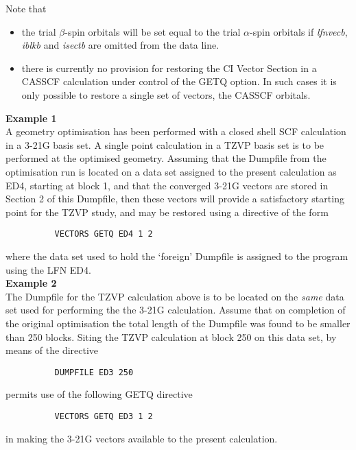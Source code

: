 \documentclass[11pt,fleqn]{article}
\begin{document}
\begin{enumerate}
 Note that
\begin{itemize}
\item  the trial $\beta$-spin orbitals will be set equal to the
trial $\alpha$-spin orbitals if {\em lfnvecb}, {\em iblkb} and {\em isectb} are
omitted from the data line.
\item  there is currently no provision for restoring the CI Vector
Section in a CASSCF calculation under control of the GETQ option.
In such cases it is only possible to restore a single set of vectors,
the CASSCF orbitals.
\end{itemize}
\end{enumerate}
{\bf Example 1}\\

A geometry optimisation has been performed with a
closed shell SCF calculation in a 3-21G basis set. A single point
calculation in a TZVP basis set is to be performed at the
optimised geometry. Assuming that the Dumpfile from the optimisation
run is located on a data set assigned to the present calculation as
ED4, starting at block 1, and that the converged 3-21G vectors
are stored in Section 2 of this Dumpfile, then these vectors
will provide a satisfactory starting point for the TZVP
study, and may be restored using a directive of the form

{
\footnotesize
\begin{verbatim}
          VECTORS GETQ ED4 1 2
\end{verbatim}
}
where the data set used to hold the `foreign' Dumpfile is
assigned to the program using the LFN ED4.\\

{\bf Example 2}\\

The Dumpfile for the TZVP calculation above
is to be located on the {\em same}  data set used for performing the
the 3-21G calculation. Assume that on completion of the original
optimisation the total length of the Dumpfile was found to be
smaller than 250 blocks. Siting the TZVP calculation at block 250
on this data set, by means of the directive

{
\footnotesize
\begin{verbatim}
          DUMPFILE ED3 250
\end{verbatim}
}
permits use of the following GETQ directive
{
\footnotesize
\begin{verbatim}
          VECTORS GETQ ED3 1 2
\end{verbatim}
}
in making the 3-21G vectors available to the present calculation.\\
\end{document}
